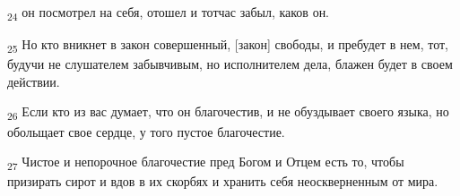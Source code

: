 \begin{tcolorbox}
\textsubscript{24} он посмотрел на себя, отошел и тотчас забыл, каков он.
\end{tcolorbox}
\begin{tcolorbox}
\textsubscript{25} Но кто вникнет в закон совершенный, [закон] свободы, и пребудет в нем, тот, будучи не слушателем забывчивым, но исполнителем дела, блажен будет в своем действии.
\end{tcolorbox}
\begin{tcolorbox}
\textsubscript{26} Если кто из вас думает, что он благочестив, и не обуздывает своего языка, но обольщает свое сердце, у того пустое благочестие.
\end{tcolorbox}
\begin{tcolorbox}
\textsubscript{27} Чистое и непорочное благочестие пред Богом и Отцем есть то, чтобы призирать сирот и вдов в их скорбях и хранить себя неоскверненным от мира.
\end{tcolorbox}
